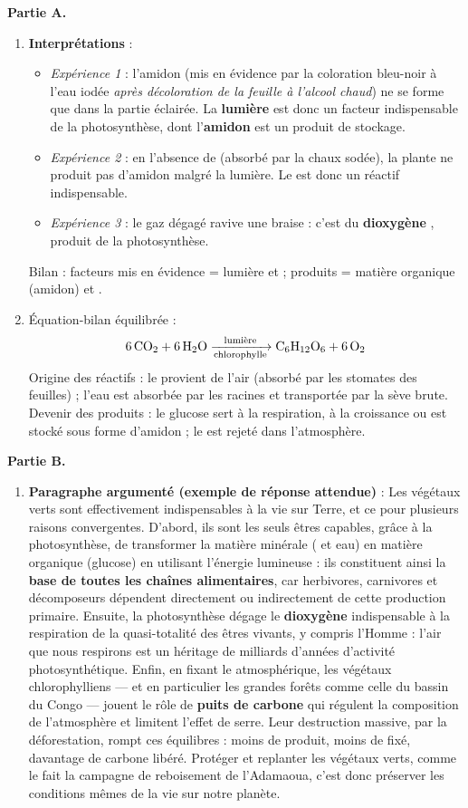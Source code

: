 \documentclass[11pt]{article}
\begin{document}
\begin{corrige}
\textbf{Partie A.}
\begin{enumerate}
\item \textbf{Interprétations} :
\begin{itemize}
\item \emph{Expérience 1} : l'amidon (mis en évidence par la coloration bleu-noir à l'eau iodée \emph{après décoloration de la feuille à l'alcool chaud}) ne se forme que dans la partie éclairée. La \textbf{lumière} est donc un facteur indispensable de la photosynthèse, dont l'\textbf{amidon} est un produit de stockage.
\item \emph{Expérience 2} : en l'absence de  (absorbé par la chaux sodée), la plante ne produit pas d'amidon malgré la lumière. Le \textbf{} est donc un réactif indispensable.
\item \emph{Expérience 3} : le gaz dégagé ravive une braise : c'est du \textbf{dioxygène }, produit de la photosynthèse.
\end{itemize}
Bilan : facteurs mis en évidence = lumière et  ; produits = matière organique (amidon) et .
\item Équation-bilan équilibrée :
\[ \ce{6CO2 + 6H2O ->[$\text{lumière}$][\text{chlorophylle}] C6H12O6 + 6O2} \]
Origine des réactifs : le  provient de l'air (absorbé par les stomates des feuilles) ; l'eau est absorbée par les racines et transportée par la sève brute. Devenir des produits : le glucose sert à la respiration, à la croissance ou est stocké sous forme d'amidon ; le  est rejeté dans l'atmosphère.
\end{enumerate}
\textbf{Partie B.}
\begin{enumerate}
\item[3.] \textbf{Paragraphe argumenté (exemple de réponse attendue)} : Les végétaux verts sont effectivement indispensables à la vie sur Terre, et ce pour plusieurs raisons convergentes. D'abord, ils sont les seuls êtres capables, grâce à la photosynthèse, de transformer la matière minérale ( et eau) en matière organique (glucose) en utilisant l'énergie lumineuse : ils constituent ainsi la \textbf{base de toutes les chaînes alimentaires}, car herbivores, carnivores et décomposeurs dépendent directement ou indirectement de cette production primaire. Ensuite, la photosynthèse dégage le \textbf{dioxygène} indispensable à la respiration de la quasi-totalité des êtres vivants, y compris l'Homme : l'air que nous respirons est un héritage de milliards d'années d'activité photosynthétique. Enfin, en fixant le  atmosphérique, les végétaux chlorophylliens — et en particulier les grandes forêts comme celle du bassin du Congo — jouent le rôle de \textbf{puits de carbone} qui régulent la composition de l'atmosphère et limitent l'effet de serre. Leur destruction massive, par la déforestation, rompt ces équilibres : moins de  produit, moins de  fixé, davantage de carbone libéré. Protéger et replanter les végétaux verts, comme le fait la campagne de reboisement de l'Adamaoua, c'est donc préserver les conditions mêmes de la vie sur notre planète.

\end{enumerate}
\end{corrige}
\end{document}
